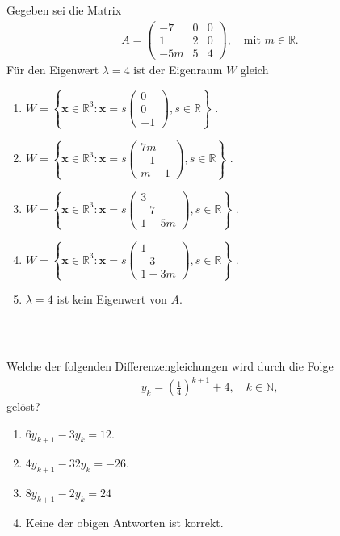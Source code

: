 \subsection*{}
Gegeben sei die Matrix
\begin{align*}
	A =
	\begin{pmatrix}
		-7 & 0 & 0 \\
		1 & 2 & 0 \\
		-5m & 5 & 4
	\end{pmatrix}
	, 
	\quad 
	\textrm{mit } m \in \mathbb{R}.
\end{align*}
Für den Eigenwert $ \lambda = 4 $ ist der Eigenraum $ W $ gleich
\renewcommand{\labelenumi}{(\alph{enumi})}
\begin{enumerate}
	\item 
	$ W
	=
	\left\{
	\textbf{x} \in \mathbb{R}^3
	:
	\textbf{x}
	=
	s 
	\begin{pmatrix}
		0\\ 0 \\ -1
	\end{pmatrix},
	s \in \mathbb{R}
	\right\}
	 $
	.
	\item 
	$ W
	=
	\left\{
	\textbf{x} \in \mathbb{R}^3
	:
	\textbf{x}
	=
	s	 
	\begin{pmatrix}
		7m \\ -1 \\ m-1
	\end{pmatrix},
	s \in \mathbb{R}
	\right\}
	$
	.
	\item
	$ W
	=
	\left\{
	\textbf{x} \in \mathbb{R}^3
	:
	\textbf{x}
	=
	s	 
	\begin{pmatrix}
		3 \\ -7 \\ 1 - 5m
	\end{pmatrix},
	s \in \mathbb{R}
	\right\}
	$
	.
	\item
	$ W
	=
	\left\{
	\textbf{x} \in \mathbb{R}^3
	:
	\textbf{x}
	=
	s	 
	\begin{pmatrix}
		1 \\ -3 \\ 1 - 3m
	\end{pmatrix},
	s \in \mathbb{R}
	\right\}
	$
	.
	\item
	$ \lambda = 4 $ ist kein Eigenwert von $ A $.
\end{enumerate}
\ \\
\subsection*{}
Welche der folgenden Differenzengleichungen wird durch die Folge
\begin{align*}
	y_{k} = \left(\frac{1}{4}\right)^{k+1} + 4, \quad k \in \mathbb{N},
\end{align*}
gelöst?
\renewcommand{\labelenumi}{(\alph{enumi})}
\begin{enumerate}
\item
$ 6 y_{k+1}  - 3 y_k = 12$.
\item
$ 4 y_{k+1} - 32 y_k = -26 $.	
\item 
$ 8 y_{k+1} - 2 y_k = 24 $
\item
Keine der obigen Antworten ist korrekt.
\end{enumerate}
\ \\
